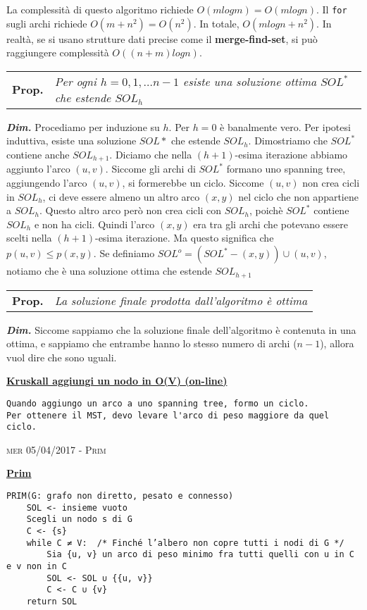 \documentclass[a4paper,10pt]{article} %
\newcommand{\dimo}[1]{%
    \smallbreak \par \hfill\begin{minipage}{0.92\linewidth}{ \scriptsize {\textbf{\em{Dim.}}} {#1} }\end{minipage} \smallskip \par}
\newcommand{\malgorithm}[1]{%
    {\bigbreak \par \hspace*{4pt} \underline{\textbf {#1}}}}
\newcommand{\msection}[1]{%
    {\newpage\bigbreak \bigbreak \par \hfil \huge \textsc {#1}}\par}
\renewcommand{\b}[1]{%
    {\textbf{#1}}}
\renewcommand{\t}[1]{%
    {\texttt{#1}}}
\newcommand{\mprop}[1]{%
    {\smallbreak\par\begin{tabular}{ll} \textbf{Prop.} & \begin{minipage}[t]{0.8\columnwidth}\emph  {#1}\end{minipage}\tabularnewline \end{tabular}}\smallskip\par}
\begin{document}
La complessità di questo algoritmo richiede $O(mlogm) = O(mlogn)$. Il \t{for} sugli archi richiede $O(m + n^2) = O(n^2)$. In totale, $O(mlogn + n^2)$. In realtà, se si usano strutture dati precise come il \b{merge-find-set}, si può raggiungere complessità $O((n + m)logn)$.

\mprop{Per ogni $h = 0,1, \ldots n-1$ esiste una soluzione ottima $SOL^*$ che estende $SOL_h$}
\dimo{
    Procediamo per induzione su $h$. Per $h = 0$ è banalmente vero. Per ipotesi induttiva, esiste una soluzione $SOL*$ che estende $SOL_h$. Dimostriamo che $SOL^*$ contiene anche $SOL_{h+1}$. Diciamo che nella $(h+1)$-esima iterazione abbiamo aggiunto l'arco $(u,v)$. Siccome gli archi di $SOL^*$ formano uno spanning tree, aggiungendo l'arco $(u,v)$, si formerebbe un ciclo. Siccome $(u,v)$ non crea cicli in $SOL_h$, ci deve essere almeno un altro arco $(x,y)$ nel ciclo che non appartiene a $SOL_h$. Questo altro arco però non crea cicli con $SOL_h$, poichè $SOL^*$ contiene $SOL_h$ e non ha cicli. Quindi l'arco $(x,y)$ era tra gli archi che potevano essere scelti nella $(h+1)$-esima iterazione. Ma questo significa che $p(u,v) \leq p(x,y)$. Se definiamo $SOL^o = (SOL^* - (x,y)) \cup (u,v)$, notiamo che è una soluzione ottima che estende $SOL_{h+1}$
    }

\mprop{La soluzione finale prodotta dall'algoritmo è ottima}
\dimo{Siccome sappiamo che la soluzione finale dell'algoritmo è contenuta in una ottima, e sappiamo che entrambe hanno lo stesso numero di archi ($n - 1$), allora vuol dire che sono uguali.}


\malgorithm{Kruskall aggiungi un nodo in O(V) (on-line)}
\begin{lstlisting}
Quando aggiungo un arco a uno spanning tree, formo un ciclo. 
Per ottenere il MST, devo levare l'arco di peso maggiore da quel ciclo.
\end{lstlisting}



\msection{mer 05/04/2017 - Prim}




\malgorithm{Prim}
\begin{lstlisting}
PRIM(G: grafo non diretto, pesato e connesso)
    SOL <- insieme vuoto
    Scegli un nodo s di G
    C <- {s}
    while C ≠ V:  /* Finché l’albero non copre tutti i nodi di G */
        Sia {u, v} un arco di peso minimo fra tutti quelli con u in C e v non in C
        SOL <- SOL ∪ {{u, v}}
        C <- C ∪ {v}
    return SOL
\end{lstlisting}
\end{document}
